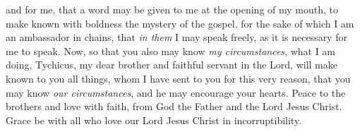 \begin{biblechapter}
\verse and for me, that a word may be given to me at the opening of my mouth, to make known with boldness the mystery of the gospel,
\verse for the sake of which I am an ambassador in chains, that \textit{in them} I may speak freely, as it is necessary for me to speak.
 Now, so that you also may know \textit{my circumstances}, what I am doing, Tychicus, my dear brother and faithful servant in the Lord, will make known to you all things,
\verse whom I have sent to you for this very reason, that you may know \textit{our circumstances}, and he may encourage your hearts.
\verse Peace to the brothers and love with faith, from God the Father and the Lord Jesus Christ.
\verse Grace be with all who love our Lord Jesus Christ in incorruptibility.
\end{biblechapter}


